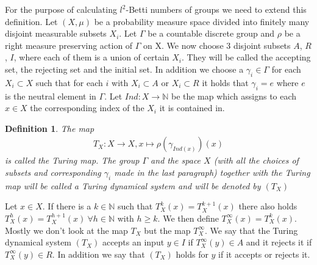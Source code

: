 \documentclass[12pt,a4paper]{scrartcl}
\newtheorem{Definition}[Theorem]{Definition}
\numberwithin{equation}{section}
\newcommand{\N}{\mathbb{N}} %
\newcommand{\2}{\mathbb{Z} / 2 \mathbb{Z}}
\newcommand{\1}{\overline{1}}
\newcommand{\0}{\overline{0}}
\begin{document}
For the purpose of calculating $l^2$-Betti numbers of groups we need to extend this definition. Let $(X, \mu)$ be a probability measure space divided into finitely many disjoint measurable subsets $X_i$. Let $\Gamma$ be a countable discrete group and $\rho$ be a right measure preserving action of $\Gamma$ on X.
We now choose 3 disjoint subsets $A$, $R$, $I$, where each of them is a union of certain $X_i$. They will be called the accepting set, the rejecting set and the initial set. In addition we choose a $\gamma_i \in \Gamma$ for each $X_i \subset X$ such that for each $i$ with $X_i \subset A$ or $X_i \subset R$ it holds that $\gamma_i = e$ where $e$ is the neutral element in $\Gamma$. 
Let $Ind: X \to \N$ be the map which assigns to each $x \in X$ the corresponding index of the $X_i$ it is contained in.
\begin{Definition}
	 The map 
	 \begin{align*}
	 T_X:X \to X, x \mapsto \rho(\gamma_{Ind(x)})(x)
	 \end{align*}
	 is called the Turing map.
	 The group $\Gamma$ and the space $X$ (with all the choices of subsets and corresponding $\gamma_i$ made in the last paragraph) together with the Turing map will be called a Turing dynamical system and will be denoted by $(T_X)$
\end{Definition}
Let $x \in X$. If there is a $k \in \N$ such that $T_X^k(x) = T_X^{k + 1}(x)$ there also holds $T_X^h(x) = T_X^{h + 1}(x) \ \forall h \in \N$ with $h \geq k$. We then define $T_X^\infty (x) = T_X^k(x)$. Mostly we don't look at the map $T_X$ but the map $T_X^\infty$. We say that the Turing dynamical system $(T_X)$ accepts an input $y \in I$ if $T_X^\infty(y) \in A$ and it rejects it if $T_X^\infty(y) \in R$. In addition we say that $(T_X)$ holds for $y$ if it accepts or rejects it.
\end{document}
